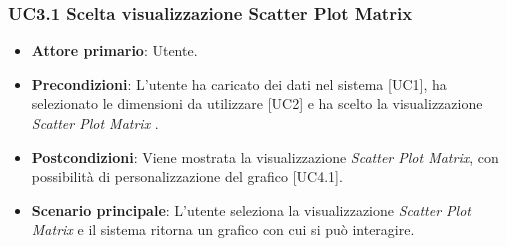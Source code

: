 \subsubsection{UC3.1 Scelta visualizzazione Scatter Plot Matrix}
\begin{itemize}
	\item \textbf{Attore primario}: Utente.
	\item \textbf{Precondizioni}: L'utente ha caricato dei dati nel sistema [UC1], ha selezionato le dimensioni da utilizzare [UC2] e ha scelto la visualizzazione \textit{Scatter Plot Matrix} .
	\item \textbf{Postcondizioni}: Viene mostrata la visualizzazione \textit{Scatter Plot Matrix}, con possibilità di personalizzazione del grafico [UC4.1].
	\item \textbf{Scenario principale}: L'utente seleziona la visualizzazione \textit{Scatter Plot Matrix} e il sistema ritorna un grafico con cui si può interagire.
\end{itemize}
